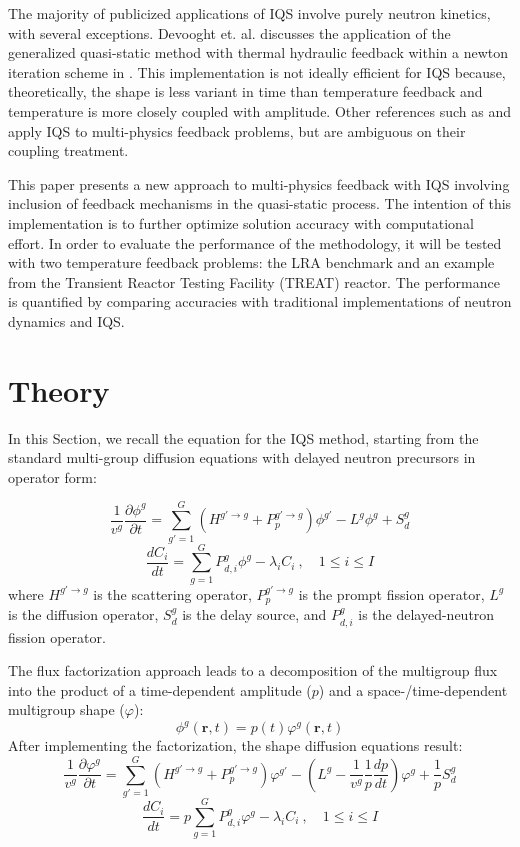 \documentclass{anstrans}
\renewcommand{\vec}[1]{\bm{#1}} %
\newcommand{\be}{\begin{equation}}
\newcommand{\ee}{\end{equation}}
\begin{document}
The majority of publicized applications of IQS involve purely neutron kinetics, with several exceptions.  Devooght et. al. discusses the application of the generalized quasi-static method with thermal hydraulic feedback within a newton iteration scheme in \cite{Devooght_1984}. This implementation is not ideally efficient for IQS because, theoretically, the shape is less variant in time than temperature feedback and temperature is more closely coupled with amplitude.  Other references such as \cite{Banfield_2013} and \cite{KIKO3D_2003} apply IQS to multi-physics feedback problems, but are ambiguous on their coupling treatment.

This paper presents a new approach to multi-physics feedback with IQS involving inclusion of feedback mechanisms in the quasi-static process.  The intention of this implementation is to further optimize solution accuracy with computational effort.  In order to evaluate the performance of the methodology, it will be tested with two temperature feedback problems: the LRA benchmark and an example from the Transient Reactor Testing Facility (TREAT) reactor.  The performance is quantified by comparing accuracies with traditional implementations of neutron dynamics and IQS.


\section{Theory}

In this Section, we recall the equation for the IQS method, starting from the standard multi-group diffusion equations with delayed neutron precursors in operator form:

\be
\frac{1}{v^g}\frac{\partial \phi^g}{\partial t} = \sum_{g'=1}^G \left(H^{g'\to g} + P_p^{g' \to g} \right) \phi^{g'} - L^g\phi^g + S_{d}^g
\label{eq:flux}
\ee 
\be
\frac{dC_i}{dt} = \sum_{g=1}^G P_{d,i}^g \phi^{g} - \lambda_i C_i \ , \quad 1 \le i \le I 
\label{eq:precursor}
\ee
%
where $H^{g'\to g}$ is the scattering operator, $P_p^{g' \to g}$ is the prompt fission operator, $L^g$ is the diffusion operator, 
$S_{d}^g$ is the delay source, and $P_{d,i}^g$ is the delayed-neutron fission operator.

The flux factorization approach leads to a decomposition of the multigroup flux into the product of a time-dependent amplitude ($p$) and a space-/time-dependent 
multigroup shape ($\varphi$):
\be
\phi^g(\vec{r},t)=p(t)\varphi^g(\vec{r},t)
\ee
After implementing the factorization, the shape diffusion equations result:
\be
\frac{1}{v^g}\frac{\partial \varphi^g}{\partial t} = \sum_{g'=1}^G \left(H^{g'\to g} + P_p^{g' \to g} \right) \varphi^{g'} - \left(L^g - \boxed{\frac{1}{v^g}\frac{1}{p}\frac{dp}{dt}}\right)\varphi^g + \boxed{\frac{1}{p}}S_{d}^g
\label{eq:shape}
\ee 
\be
\frac{dC_i}{dt} = \boxed{p}\sum_{g=1}^G P_{d,i}^g \varphi^{g} - \lambda_i C_i \ , \quad 1 \le i \le I 
\label{eq:prec}
\ee
\end{document}
